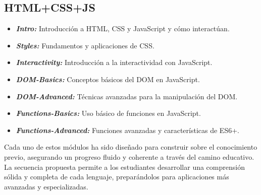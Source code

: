 \begin{appendices}
\section{HTML+CSS+JS}
\begin{itemize}
    \item \textbf{\textit{Intro:}} Introducción a HTML, CSS y JavaScript y cómo interactúan.
    \item \textbf{\textit{Styles:}} Fundamentos y aplicaciones de CSS.
    \item \textbf{\textit{Interactivity:}} Introducción a la interactividad con JavaScript.
    \item \textbf{\textit{DOM-Basics:}} Conceptos básicos del DOM en JavaScript.
    \item \textbf{\textit{DOM-Advanced:}} Técnicas avanzadas para la manipulación del DOM.
    \item \textbf{\textit{Functions-Basics:}} Uso básico de funciones en JavaScript.
    \item \textbf{\textit{Functions-Advanced:}} Funciones avanzadas y características de ES6+.
\end{itemize}

Cada uno de estos módulos ha sido diseñado para construir sobre el conocimiento previo, asegurando un progreso fluido y coherente a través del camino educativo. La secuencia propuesta permite a los estudiantes desarrollar una comprensión sólida y completa de cada lenguaje, preparándolos para aplicaciones más avanzadas y especializadas.

\end{appendices}